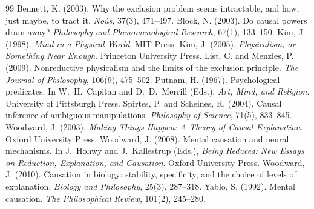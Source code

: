 \documentclass{situationist-preprint}
\begin{document}
\begin{thebibliography}{99}\small
{} Bennett, K. (2003). Why the exclusion problem seems intractable, and how, just maybe, to tract it. \emph{No\^us}, 37(3), 471--497.
 Block, N. (2003). Do causal powers drain away? \emph{Philosophy and Phenomenological Research}, 67(1), 133--150.
 Kim, J. (1998). \emph{Mind in a Physical World}. MIT Press.
 Kim, J. (2005). \emph{Physicalism, or Something Near Enough}. Princeton University Press.
 List, C. and Menzies, P. (2009). Nonreductive physicalism and the limits of the exclusion principle. \emph{The Journal of Philosophy}, 106(9), 475--502.
 Putnam, H. (1967). Psychological predicates. In W.~H.~Capitan and D.~D.~Merrill (Eds.), \emph{Art, Mind, and Religion}. University of Pittsburgh Press.
 Spirtes, P. and Scheines, R. (2004). Causal inference of ambiguous manipulations. \emph{Philosophy of Science}, 71(5), 833--845.
 Woodward, J. (2003). \emph{Making Things Happen: A Theory of Causal Explanation}. Oxford University Press.
 Woodward, J. (2008). Mental causation and neural mechanisms. In J.~Hohwy and J.~Kallestrup (Eds.), \emph{Being Reduced: New Essays on Reduction, Explanation, and Causation}. Oxford University Press.
 Woodward, J. (2010). Causation in biology: stability, specificity, and the choice of levels of explanation. \emph{Biology and Philosophy}, 25(3), 287--318.
 Yablo, S. (1992). Mental causation. \emph{The Philosophical Review}, 101(2), 245--280.
\end{thebibliography}
\end{document}
